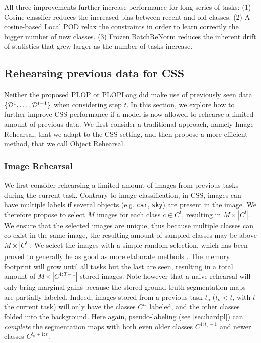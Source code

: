 All three improvements further increase performance for long series of tasks: (1) Cosine classifer
reduces the increased bias between recent and old classes. (2) A cosine-based Local POD relax the
constraints in order to learn correctly the bigger number of new classes. (3) Frozen BatchReNorm
reduces the inherent drift of statistics that grew larger as the number of tasks increase.


\subsection{Rehearsing previous data for CSS}\label{sec:object_rehearsal}

Neither the proposed PLOP or PLOPLong did make use of previously seen data $\{\mathcal{D}^{1}, \dots,
    \mathcal{D}^{t-1}\}$ when considering step $t$. In this section, we explore how to further improve CSS
performance if a model is now allowed to rehearse a limited amount of previous data. We first
consider a traditional approach, namely Image Rehearsal, that we adapt to the CSS setting, and then
propose a more efficient method, that we call Object Rehearsal.

\subsubsection{Image Rehearsal}

We first consider rehearsing a limited amount of images from previous tasks during the current task.
Contrary to image classification, in CSS, images can have multiple labels if several objects (e.g.
\texttt{car}, \texttt{sky}) are present in the image. We therefore propose to select $M$ images for
each class $c \in C^t$, resulting in $M \times |C^t|$. We ensure that the selected images are
unique, thus because multiple classes can co-exist in the same image, the resulting amount of
sampled classes may be above $M \times |C^t|$. We select the images with a simple random selection,
which has been proved to generally be as good as more elaborate methods
\citep{castro2018end_to_end_inc_learn}. The memory footprint will grow until all tasks but the last
are seen, resulting in a total amount of $M \times |C^{1:T-1}|$ stored images. Note however that a
naive rehearsal will only bring marginal gains because the stored ground truth segmentation maps are
partially labeled. Indeed, images stored from a previous task $t_o$ ($t_o < t$, with $t$ the current
task) will only have the classes $C^{t_o}$ labeled, and the other classes folded into the
background. Here again, pseudo-labeling (see \autoref{sec:hardpl}) can \textit{complete} the
segmentation maps with both even older classes $C^{1:t_o-1}$ and newer classes $C^{t_o+1:t}$.

